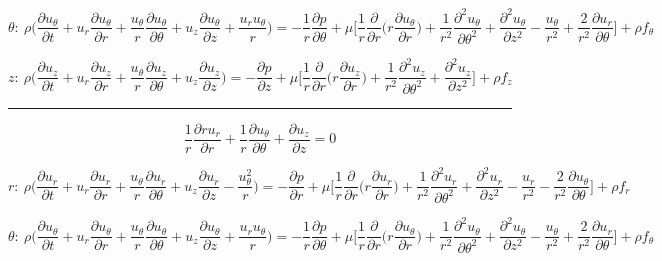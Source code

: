 \documentclass{article}
\begin{document}
            \[\theta: \ \rho \bigg(\frac{\partial u_{\theta}}{\partial t} + u_{r} \frac{\partial u_{\theta}}{\partial r} + \frac{u_{\theta}}{r} \frac{\partial u_{\theta}}{\partial \theta} + u_{z}\frac{\partial u_{\theta}}{\partial z} + \frac{u_{r}u_{\theta}}{r} \bigg) = -\frac{1}{r} \frac{\partial p}{\partial \theta} + \mu \bigg[ \frac{1}{r}\frac{\partial}{\partial r} \bigg(r \frac{\partial u_{\theta}}{\partial r}\bigg) + \frac{1}{r^{2}} \frac{\partial^{2} u_{\theta}}{\partial \theta^{2}} + \frac{\partial^{2} u_{\theta}}{\partial z^{2}} - \frac{u_{\theta}}{r^{2}} + \frac{2}{r^{2}}\frac{\partial u_{r}}{\partial \theta}\bigg] + \rho f_{\theta}\]
            
            \[z: \ \rho \bigg(\frac{\partial u_{z}}{\partial t} + u_{r} \frac{\partial u_{z}}{\partial r} + \frac{u_{\theta}}{r}\frac{\partial u_{z}}{\partial \theta} + u_{z}\frac{\partial u_{z}}{\partial z} \bigg) = -\frac{\partial p}{\partial z} + \mu \bigg[ \frac{1}{r}\frac{\partial}{\partial r} \bigg(r \frac{\partial u_{z}}{\partial r}\bigg) + \frac{1}{r^{2}} \frac{\partial^{2} u_{z}}{\partial \theta^{2}} + \frac{\partial^{2} u_{z}}{\partial z^{2}} \bigg] + \rho f_{z}\]

 \vspace{.5cm} \hrule   \vspace{.5cm} \[\frac{1}{r}\frac{\partial ru_{r}}{\partial r} + \frac{1}{r}\frac{\partial u_{\theta}}{\partial \theta} + \frac{\partial u_{z}}{\partial z}=0\]
            
            \[r: \ \rho \bigg(\frac{\partial u_{r}}{\partial t} + u_{r} \frac{\partial u_{r}}{\partial r} + \frac{u_{\theta}}{r}\frac{\partial u_{r}}{\partial \theta} + u_{z}\frac{\partial u_{r}}{\partial z} - \frac{u_{\theta}^{2}}{r} \bigg) = -\frac{\partial p}{\partial r} + \mu \bigg[ \frac{1}{r}\frac{\partial}{\partial r} \bigg(r \frac{\partial u_{r}}{\partial r}\bigg) + \frac{1}{r^{2}} \frac{\partial^{2} u_{r}}{\partial \theta^{2}} + \frac{\partial^{2} u_{r}}{\partial z^{2}} - \frac{u_{r}}{r^{2}} - \frac{2}{r^{2}}\frac{\partial u_{\theta}}{\partial \theta}\bigg] + \rho f_{r}\]
            
            \[\theta: \ \rho \bigg(\frac{\partial u_{\theta}}{\partial t} + u_{r} \frac{\partial u_{\theta}}{\partial r} + \frac{u_{\theta}}{r} \frac{\partial u_{\theta}}{\partial \theta} + u_{z}\frac{\partial u_{\theta}}{\partial z} + \frac{u_{r}u_{\theta}}{r} \bigg) = -\frac{1}{r} \frac{\partial p}{\partial \theta} + \mu \bigg[ \frac{1}{r}\frac{\partial}{\partial r} \bigg(r \frac{\partial u_{\theta}}{\partial r}\bigg) + \frac{1}{r^{2}} \frac{\partial^{2} u_{\theta}}{\partial \theta^{2}} + \frac{\partial^{2} u_{\theta}}{\partial z^{2}} - \frac{u_{\theta}}{r^{2}} + \frac{2}{r^{2}}\frac{\partial u_{r}}{\partial \theta}\bigg] + \rho f_{\theta}\]
            
\end{document}
